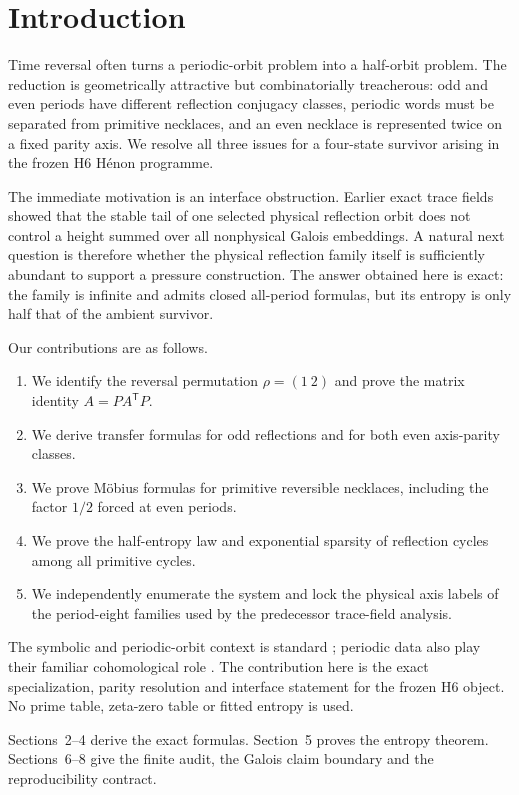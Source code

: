 \section{Introduction}

Time reversal often turns a periodic-orbit problem into a half-orbit problem.
The reduction is geometrically attractive but combinatorially treacherous:
odd and even periods have different reflection conjugacy classes, periodic
words must be separated from primitive necklaces, and an even necklace is
represented twice on a fixed parity axis.  We resolve all three issues for a
four-state survivor arising in the frozen H6 H\'enon programme.

The immediate motivation is an interface obstruction.  Earlier exact trace
fields showed that the stable tail of one selected physical reflection orbit
does not control a height summed over all nonphysical Galois embeddings.  A
natural next question is therefore whether the physical reflection family
itself is sufficiently abundant to support a pressure construction.  The
answer obtained here is exact: the family is infinite and admits closed
all-period formulas, but its entropy is only half that of the ambient
survivor.

Our contributions are as follows.
\begin{enumerate}
\item We identify the reversal permutation $\rho=(1\ 2)$ and prove the matrix
identity $A=P A^{\mathsf T}P$.
\item We derive transfer formulas for odd reflections and for both even
axis-parity classes.
\item We prove M\"obius formulas for primitive reversible necklaces, including
the factor $1/2$ forced at even periods.
\item We prove the half-entropy law and exponential sparsity of reflection
cycles among all primitive cycles.
\item We independently enumerate the system and lock the physical axis labels
of the period-eight families used by the predecessor trace-field analysis.
\end{enumerate}

The symbolic and periodic-orbit context is standard
\citep{Bowen1975,ParryPollicott1990}; periodic data also play their familiar
cohomological role \citep{Livshits1972}.  The contribution here is the exact
specialization, parity resolution and interface statement for the frozen H6
object.  No prime table, zeta-zero table or fitted entropy is used.

Sections~2--4 derive the exact formulas.  Section~5 proves the entropy
theorem.  Sections~6--8 give the finite audit, the Galois claim boundary and
the reproducibility contract.
